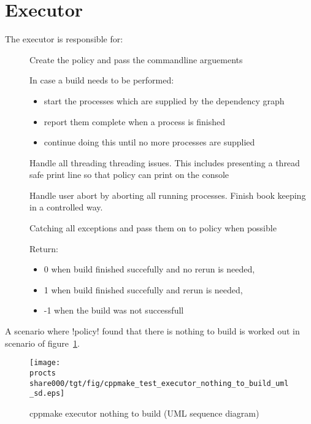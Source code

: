 \section{Executor}
\label{sec:share000.cppmake.executor}

The executor is responsible for:
\begin{description}
\item[]
    Create the policy and pass the commandline arguements
\item[]
    In case a build needs to be performed:
    \begin{itemize}
    \item start the processes which are supplied by the dependency graph
    \item report them complete when a process is finished
    \item continue doing this until no more processes are supplied
    \end{itemize}
\item[]
    Handle all threading threading issues. This includes
    presenting a thread safe print line so that policy can print on the console
\item[]
    Handle user abort by aborting all running processes. Finish book keeping in a controlled way.
\item[]
    Catching all exceptions and pass them on to policy when possible
\item[]
    Return:
    \begin{itemize}
    \item  0 when build finished succefully and no rerun is needed, 
    \item  1 when build finished succefully and rerun is needed,
    \item -1 when the build was not successfull
    \end{itemize}
\end{description}

A scenario where !policy! found that there is nothing to build is worked out
in scenario of figure~\ref{fig:share000.cppmake.cppmake_test_executor_nothing_to_build_uml_sd}.

\begin{figure}[tbh]
    \begin{center}
        \texttt{[image: \\procts share000/tgt/fig/cppmake\_test\_executor\_nothing\_to\_build\_uml\_sd.eps]}
    \end{center}
    \caption{cppmake executor nothing to build (UML sequence diagram) }
	\label{fig:share000.cppmake.cppmake_test_executor_nothing_to_build_uml_sd}
\end{figure}

